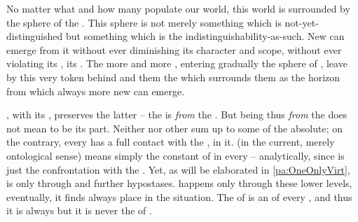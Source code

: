 No matter what and how many  populate our world, this world is
surrounded by the sphere of the . This sphere is
not merely something which is not-yet-distinguished but something which is the
indistinguishability-as-such. New  can emerge from it without
ever diminishing its character and scope, without ever violating
its , its . The more
and more , entering gradually the sphere of
, leave by this very token behind and  them the
 which surrounds them as the horizon from which always more
new  can emerge. 

\pa {},  with its , preserves the
latter -- the  is  {\em from} the . But being
thus  {\em from} the  does not mean to be its part. 
Neither  nor other
 sum up to some   of the
{absolute}; on the contrary, every  has a full contact with the
,  in it.   (in the current,
merely ontological sense) means simply the constant  of  in
every  -- analytically, since  is just the
confrontation with the .  Yet, as will be elaborated in
\ref{pa:OneOnlyVirt},  is  only through  and
further hypostases.  happens only through these
lower levels, eventually, it finds always place in the  situation.
The  of  is an  of every ,
and thus it is always  but it is never the  of
.

